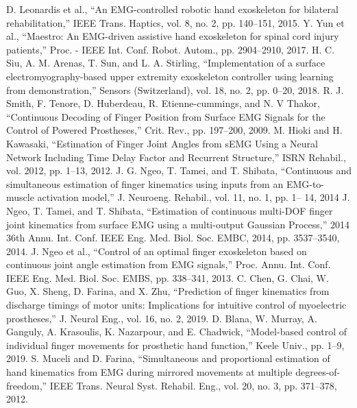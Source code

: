 \documentclass[conference]{IEEEtran}
\begin{document}
\begin{thebibliography}{00}
 D. Leonardis et al., “An EMG-controlled robotic hand exoskeleton for bilateral rehabilitation,” IEEE Trans. Haptics, vol. 8, no. 2, pp. 140–151, 2015.
 Y. Yun et al., “Maestro: An EMG-driven assistive hand exoskeleton for spinal cord injury patients,” Proc. - IEEE Int. Conf. Robot. Autom., pp. 2904–2910, 2017.
 H. C. Siu, A. M. Arenas, T. Sun, and L. A. Stirling, “Implementation of a surface electromyography-based upper extremity exoskeleton controller using learning from demonstration,” Sensors 
(Switzerland), vol. 18, no. 2, pp. 0–20, 2018.
 R. J. Smith, F. Tenore, D. Huberdeau, R. Etienne-cummings, and N. V Thakor, “Continuous Decoding 
of Finger Position from Surface EMG Signals for the Control of Powered Prostheses,” Crit. Rev., pp. 
197–200, 2009.
 M. Hioki and H. Kawasaki, “Estimation of Finger Joint Angles from sEMG Using a Neural Network 
Including Time Delay Factor and Recurrent Structure,” ISRN Rehabil., vol. 2012, pp. 1–13, 2012.
 J. G. Ngeo, T. Tamei, and T. Shibata, “Continuous and simultaneous estimation of finger kinematics 
using inputs from an EMG-to-muscle activation model,” J. Neuroeng. Rehabil., vol. 11, no. 1, pp. 1–
14, 2014
 J. Ngeo, T. Tamei, and T. Shibata, “Estimation of continuous multi-DOF finger joint kinematics from surface EMG using a multi-output Gaussian Process,” 2014 36th Annu. Int. Conf. IEEE Eng. Med. Biol. Soc. EMBC, 2014, pp. 3537–3540, 2014.
 J. Ngeo et al., “Control of an optimal finger exoskeleton based on continuous joint angle estimation 
from EMG signals,” Proc. Annu. Int. Conf. IEEE Eng. Med. Biol. Soc. EMBS, pp. 338–341, 2013.
 C. Chen, G. Chai, W. Guo, X. Sheng, D. Farina, and X. Zhu, “Prediction of finger kinematics from 
discharge timings of motor units: Implications for intuitive control of myoelectric prostheses,” J. 
Neural Eng., vol. 16, no. 2, 2019.
 D. Blana, W. Murray, A. Ganguly, A. Krasoulis, K. Nazarpour, and E. Chadwick, “Model-based 
control of individual finger movements for prosthetic hand function,” Keele Univ., pp. 1–9, 2019.
 S. Muceli and D. Farina, “Simultaneous and proportional estimation of hand kinematics from EMG during mirrored movements at multiple degrees-of-freedom,” IEEE Trans. Neural Syst. Rehabil. Eng., vol. 20, no. 3, pp. 371–378, 2012.


\end{thebibliography}
\end{document}
